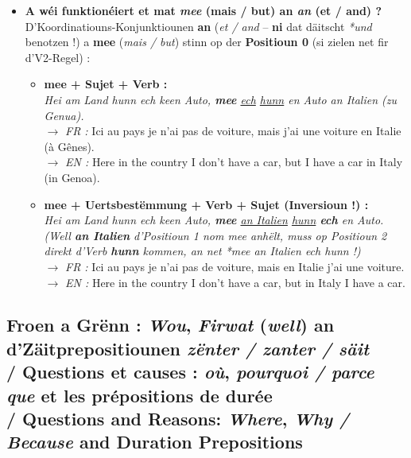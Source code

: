 \begin{itemize}
    \item \textbf{A wéi funktionéiert et mat \textit{mee} (mais / but) an \textit{an} (et / and) ?} \\
    D'Koordinatiouns-Konjunktiounen \textbf{an} (\textit{et / and} -- \textbf{ni} dat däitscht \textit{*und} benotzen !) a \textbf{mee} (\textit{mais / but}) stinn op der \textbf{Positioun 0} (si zielen net fir d'V2-Regel) :
    \begin{itemize}
        \item \textbf{mee + Sujet + Verb :} \\
        \textit{Hei am Land hunn ech keen Auto, \textbf{mee} \underline{ech} \underline{hunn} en Auto an Italien (zu Genua).} \\
        $\rightarrow$ \textit{FR :} Ici au pays je n'ai pas de voiture, mais j'ai une voiture en Italie (à Gênes). \\
        $\rightarrow$ \textit{EN :} Here in the country I don't have a car, but I have a car in Italy (in Genoa).
        \item \textbf{mee + Uertsbestëmmung + Verb + Sujet (Inversioun !) :} \\
        \textit{Hei am Land hunn ech keen Auto, \textbf{mee} \underline{an Italien} \underline{hunn} \textbf{ech} en Auto.} \\
        \textit{(Well \textbf{an Italien} d'Positioun 1 nom \textit{mee} anhëlt, muss op Positioun 2 direkt d'Verb \textbf{hunn} kommen, an net \textit{*mee an Italien ech hunn} !)} \\
        $\rightarrow$ \textit{FR :} Ici au pays je n'ai pas de voiture, mais en Italie j'ai une voiture. \\
        $\rightarrow$ \textit{EN :} Here in the country I don't have a car, but in Italy I have a car.
    \end{itemize}
\end{itemize}

\subsection{Froen a Grënn : \textit{Wou}, \textit{Firwat} (\textit{well}) an d'Zäitprepositiounen \textit{zënter / zanter / säit} \\/ Questions et causes : \textit{où}, \textit{pourquoi / parce que} et les prépositions de durée \\/ Questions and Reasons: \textit{Where}, \textit{Why / Because} and Duration Prepositions}

